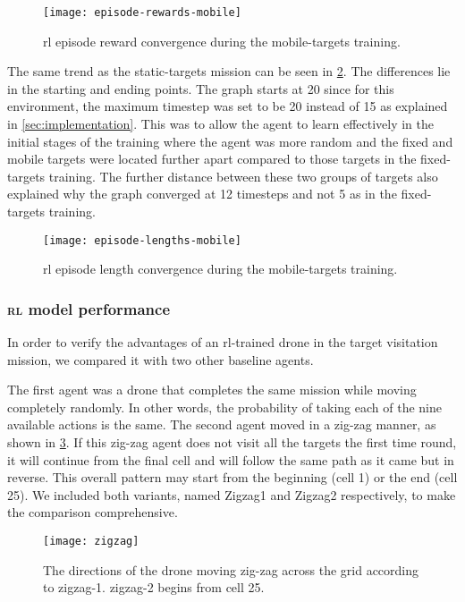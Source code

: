 \documentclass[../main.tex]{subfiles}
\begin{document}
\begin{figure}[tbp]
	\centering
	\texttt{[image: episode-rewards-mobile]}
        \caption{\gls{rl} episode reward convergence during the
        mobile-targets training.}
        \label{fig:episode-rewards-mobile}
\end{figure}

The same trend as the static-targets mission can be seen in
\cref{fig:episode-lengths-mobile}.
The differences lie in the starting and ending points.
The graph starts at 20 since for this environment, the maximum
timestep was set to be 20 instead of 15 as explained in
\cref{sec:implementation}.
This was to allow the agent to learn effectively in the initial
stages of the training where the agent was more random and the fixed
and mobile targets were located further apart compared to those targets
in the fixed-targets training.
The further distance between these two groups of targets also explained
why the graph converged at 12 timesteps and not 5 as in the
fixed-targets training.

\begin{figure}[tbp]
	\centering
	\texttt{[image: episode-lengths-mobile]}
        \caption{\gls{rl} episode length convergence during the
        mobile-targets training.}
        \label{fig:episode-lengths-mobile}
\end{figure}

\subsubsection{\textsc{rl} model performance}

In order to verify the advantages of an \gls{rl}-trained drone
in the target visitation mission, we compared it with
two other baseline agents.

The first agent was a drone that completes the same mission 
while moving completely randomly. 
In other words, the probability of taking each of the 
nine available actions is the same.
The second agent moved in a zig-zag manner, as shown
in \cref{fig:zigzag}.
If this zig-zag agent does not visit all the targets the first time
round, it will continue from the final cell and will follow the same
path as it came but in reverse.
This overall pattern may start from the beginning (cell 1) or 
the end (cell 25).
We included both variants, named Zigzag1 and Zigzag2
respectively, to make the comparison comprehensive.

\begin{figure}[tbp]
	\centering
	\texttt{[image: zigzag]}
	\caption{The directions of the drone moving zig-zag
		across the grid according to zigzag-1.
                zigzag-2 begins from cell 25.}
	\label{fig:zigzag}
\end{figure}
\end{document}
